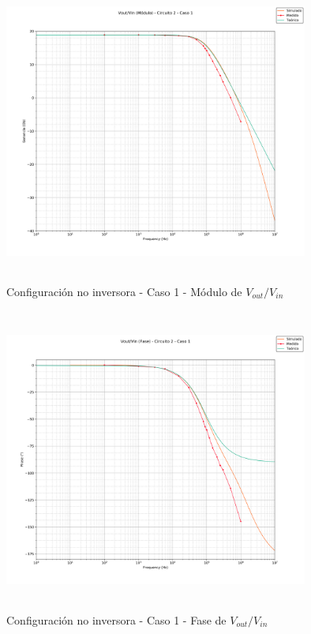 \begin{figure}[H] %
	\centering
	\includegraphics[width=10cm,height=10cm,keepaspectratio]{../EJ1/00GRAFICOS/c2c1/c2c1voviMod.png}
	\caption{Configuración no inversora - Caso 1 -  M\'odulo de $V_{out}/V_{in}$}
	\label{c2c1voviM}
\end{figure}

\begin{figure}[H] %
	\centering
	\includegraphics[width=10cm,height=10cm,keepaspectratio]{../EJ1/00GRAFICOS/c2c1/c2c1voviFASE.png}
	\caption{Configuración no inversora - Caso 1 - Fase de $V_{out}/V_{in}$}
	\label{c2c1voviP}
\end{figure}

